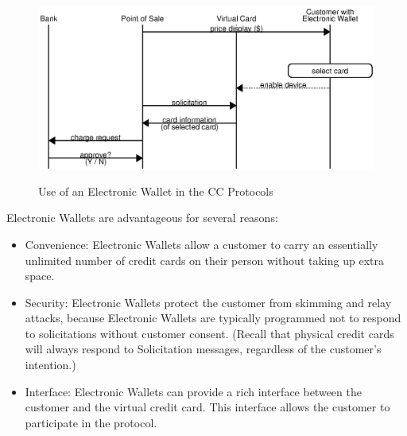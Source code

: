 \begin{figure}[h!]
  \caption{Use of an Electronic Wallet in the CC Protocols}
  \centering
    \includegraphics{img/wallet.eps}
  \label{fig:wallet}
\end{figure}

\pagebreak
Electronic Wallets are advantageous for several reasons:
\begin{itemize}
\item Convenience: Electronic Wallets allow a customer to carry an essentially unlimited number of credit cards on their person without taking up extra space.
\item Security: Electronic Wallets protect the customer from skimming and relay attacks,
    because Electronic Wallets are typically programmed not to respond to solicitations without customer consent.
    (Recall that physical credit cards will always respond to Solicitation messages, regardless of the customer's intention.)
\item Interface: Electronic Wallets can provide a rich interface between the customer and the virtual credit card.
    This interface allows the customer to participate in the protocol.
\end{itemize}

